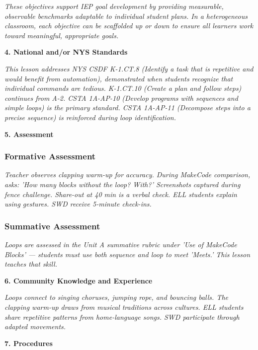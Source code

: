 \documentclass[11pt,letterpaper]{article}
\begin{document}
\textit{These objectives support IEP goal development by providing measurable, observable benchmarks adaptable to individual student plans. In a heterogeneous classroom, each objective can be scaffolded up or down to ensure all learners work toward meaningful, appropriate goals.}

\textbf{4. National and/or NYS Standards}

\textit{This lesson addresses NYS CSDF K-1.CT.8 (Identify a task that is repetitive and would benefit from automation), demonstrated when students recognize that individual commands are tedious. K-1.CT.10 (Create a plan and follow steps) continues from A-2. CSTA 1A-AP-10 (Develop programs with sequences and simple loops) is the primary standard. CSTA 1A-AP-11 (Decompose steps into a precise sequence) is reinforced during loop identification.}


\newpage
\textbf{5. Assessment}

\subsubsection{Formative Assessment}

\textit{Teacher observes clapping warm-up for accuracy. During MakeCode comparison, asks: 'How many blocks without the loop? With?' Screenshots captured during fence challenge. Share-out at 40 min is a verbal check. ELL students explain using gestures. SWD receive 5-minute check-ins.}

\subsubsection{Summative Assessment}

\textit{Loops are assessed in the Unit A summative rubric under 'Use of MakeCode Blocks' --- students must use both sequence and loop to meet 'Meets.' This lesson teaches that skill.}

\textbf{6. Community Knowledge and Experience}

\textit{Loops connect to singing choruses, jumping rope, and bouncing balls. The clapping warm-up draws from musical traditions across cultures. ELL students share repetitive patterns from home-language songs. SWD participate through adapted movements.}

\textbf{7. Procedures}
\end{document}
